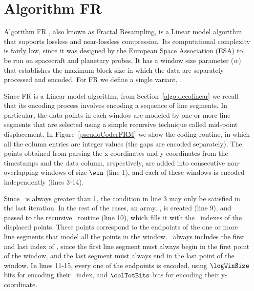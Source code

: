 
\section{Algorithm FR}
\label{algo:fr}

Algorithm FR \cite{coder:fr}, also known as Fractal Resampling, is a Linear model algorithm that supports lossless and near-lossless compression. Its computational complexity is fairly low, since it was designed by the European Space Association (ESA) to be run on spacecraft and planetary probes. It has a window size parameter ($w$) that establishes the maximum block size in which the data are separately processed and encoded. For FR we define a single variant, \maskalgo.


Since FR is a Linear model algorithm, from Section~\ref{algo:decolinear} we recall that its encoding process involves encoding a sequence of line segments. In particular, the data points in each window are modeled by one or more line segments that are selected using a simple recursive technique called mid-point displacement. In Figure~\ref{pseudoCoderFRM} we show the coding routine, in which all the column entries are integer values (the gaps are encoded separately). The points obtained from parsing the x-coordinates and y-coordinates from the timestamps and the data column, respectively, are added into consecutive non-overlapping windows of size $\win$ (line 1), and each of these windows is encoded independently (lines 3-14).


Since \win\ is always greater than 1, the condition in line 3 may only be satisfied in the last iteration. In the rest of the cases, an array, \disPoints, is created (line 9), and passed to the recursive \getDisplacedPointsMethod\ routine (line 10), which fills it with the \window\ indexes of the displaced points. These points correspond to the endpoints of the one or more line segments that model all the points in the window. \disPoints\ always includes the first and last index of \window, since the first line segment must always begin in the first point of the window, and the last segment must always end in the last point of the window. In lines 11-15, every one of the endpoints is encoded, using $\logWinSize$ bits for encoding their \window\ index, and $\colTotBits$ bits for encoding their y-coordinate.


\clearpage





